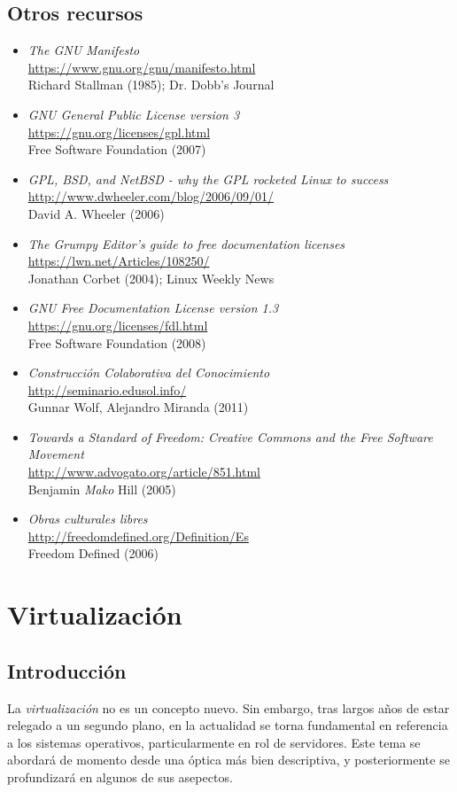 \documentclass[11pt,fleqn]{book} %
\newcommand{\otrorec}[1]{ \\ {\small \url{#1}} \\ }
\begin{document}
\section{Otros recursos}
\label{sec-8-4}


\begin{itemize}
\item \emph{The GNU Manifesto}
  \otrorec{https://www.gnu.org/gnu/manifesto.html}
  Richard Stallman  (1985); Dr. Dobb's Journal
\item \emph{GNU General Public License version 3}
  \otrorec{https://gnu.org/licenses/gpl.html}
  Free Software Foundation (2007)
\item \emph{GPL, BSD, and NetBSD - why the GPL rocketed Linux to success}
  \otrorec{http://www.dwheeler.com/blog/2006/09/01/}
  David A. Wheeler (2006)
\item \emph{The Grumpy Editor's guide to free documentation licenses}
  \otrorec{https://lwn.net/Articles/108250/}
  Jonathan Corbet (2004); Linux
  Weekly News
\item \emph{GNU Free Documentation License version 1.3}
  \otrorec{https://gnu.org/licenses/fdl.html}
  Free Software Foundation (2008)
\item \emph{Construcción Colaborativa del Conocimiento}
  \otrorec{http://seminario.edusol.info/}
  Gunnar Wolf, Alejandro
  Miranda (2011)
\item \emph{Towards a Standard of Freedom: Creative Commons and the Free   Software Movement}
  \otrorec{http://www.advogato.org/article/851.html}
  Benjamin \emph{Mako} Hill (2005)
\item \emph{Obras culturales libres}
  \otrorec{http://freedomdefined.org/Definition/Es}
  Freedom Defined (2006)
\end{itemize}
\chapter{Virtualización}
\label{sec-9}
\section{Introducción}
\label{sec-9-1}
\label{VIRT}


La \emph{virtualización} no es un concepto nuevo. Sin embargo, tras largos
años de estar relegado a un segundo plano, en la actualidad se torna
fundamental en referencia a los sistemas operativos, particularmente en
rol de servidores. Este tema se abordará de momento desde una
óptica más bien descriptiva, y posteriormente se profundizará en
algunos de sus asepectos.
\end{document}
